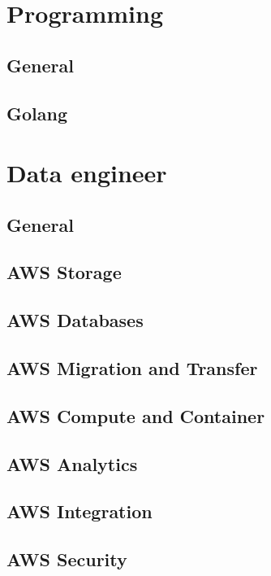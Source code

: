 \documentclass{book}
\begin{document}
\tableofcontents

\chapter{Programming}
\section{General}

\section{Golang}



\chapter{Data engineer}
\section{General}

\newpage
\section{AWS Storage}

\newpage
\section{AWS Databases}

\newpage
\section{AWS Migration and Transfer}

\newpage
\section{AWS Compute and Container}

\newpage
\section{AWS Analytics}

\newpage
\section{AWS Integration}

\newpage
\section{AWS Security}

\newpage
\end{document}
